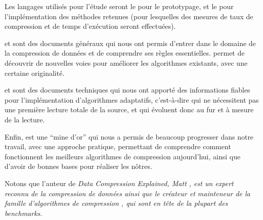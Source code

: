 \documentclass[a4paper, 11pt]{article}
\begin{document}
Les langages utilisés pour l'étude seront le  pour le prototypage, et le  pour l'implémentation des méthodes retenues (pour lesquelles des mesures de taux de compression et de temps d'exécution seront effectuées).

\printbibliography

\cite{intro_proba} et \cite{coding_crypto} sont des documents généraux qui nous ont permis d'entrer dans le domaine de la compression de données et de comprendre ses règles essentielles. \cite{dev_comp_spertes} permet de découvrir de nouvelles voies pour améliorer les algorithmes existants, avec une certaine originalité.

\cite{algo_adapt} et \cite{huff_dyn} sont des documents techniques qui nous ont apporté des informations fiables pour l'implémentation d'algorithmes adaptatifs, c'est-à-dire qui ne nécessitent pas une première lecture totale de la source, et qui évoluent donc au fur et à mesure de la lecture.

Enfin, \cite{data_comp_explained} est une ``mine d'or'' qui nous a permis de beaucoup progresser dans notre travail, avec une approche pratique, permettant de comprendre comment fonctionnent les meilleurs algorithmes de compression aujourd'hui, ainsi que d'avoir de bonnes bases pour réaliser les nôtres.

Notons que l'auteur de \it{Data Compression Explained}, Matt , est un expert reconnu de la compression de données ainsi que le créateur et mainteneur de la famille d'algorithmes de compression , qui sont en tête de la plupart des \it{benchmarks}.
\end{document}
